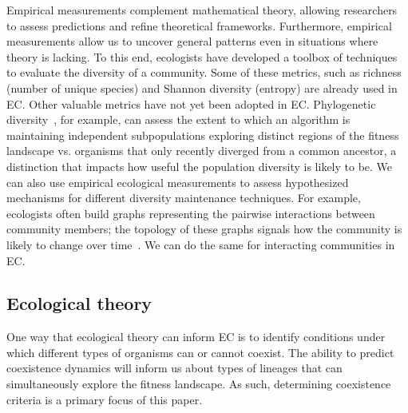 Empirical measurements complement mathematical theory, allowing researchers to assess predictions and refine theoretical frameworks. 
Furthermore, empirical measurements allow us to uncover general patterns even in situations where theory is lacking. 
To this end, ecologists have developed a toolbox of techniques to evaluate the diversity of a community.
Some of these metrics, such as richness (number of unique species) and Shannon diversity (entropy) are already used
in EC.
Other valuable metrics have not yet been adopted in EC. Phylogenetic diversity~\cite{winter_phylogenetic_2013}, for example, can assess the extent to which an algorithm is maintaining independent subpopulations exploring distinct regions of the fitness landscape vs. organisms that only recently diverged from a common ancestor,
a distinction that impacts how useful the population diversity is likely to be. We can also use empirical ecological measurements to assess hypothesized mechanisms
for different diversity maintenance techniques.
For example, ecologists often build graphs representing the pairwise interactions between community members; the topology of these graphs
signals how the community is likely to change over time~\cite{fontaine_ecological_2011}. We can do the same for interacting communities in EC.


\subsection{Ecological theory}

One way that ecological theory can inform EC is to identify conditions under which different types of organisms can or cannot coexist. The ability to predict coexistence dynamics will inform us about types of lineages that can simultaneously explore the fitness landscape. As such, determining coexistence criteria is a primary focus of this paper. %

